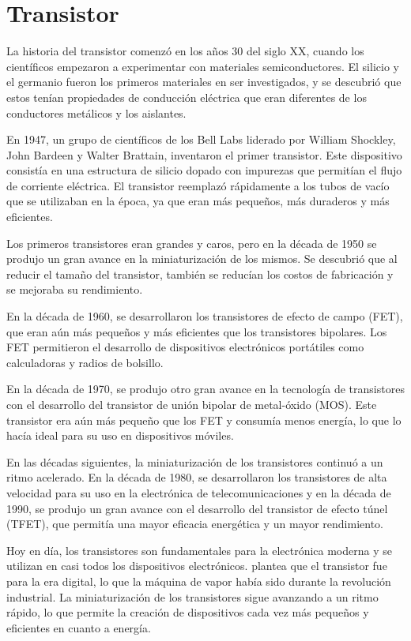 \documentclass{article}
\begin{document}
\newpage

\section*{Transistor}

La historia del transistor comenzó en los años 30 del siglo XX, cuando los científicos empezaron a experimentar
con materiales semiconductores. El silicio y el germanio fueron los primeros materiales en ser investigados, 
y se descubrió que estos tenían propiedades de conducción eléctrica que eran diferentes de los conductores metálicos
y los aislantes.

En 1947, un grupo de científicos de los Bell Labs liderado por William Shockley, John Bardeen y Walter Brattain, 
inventaron el primer transistor. Este dispositivo consistía en una estructura de silicio dopado con impurezas que 
permitían el flujo de corriente eléctrica. El transistor reemplazó rápidamente a los tubos de vacío 
que se utilizaban en la época, ya que eran más pequeños, más duraderos y más eficientes.

Los primeros transistores eran grandes y caros, pero en la década de 1950 se produjo un gran avance en la miniaturización
de los mismos. Se descubrió que al reducir el tamaño del transistor, también se reducían los costos de fabricación y se 
mejoraba su rendimiento.

En la década de 1960, se desarrollaron los transistores de efecto de campo (FET), que eran aún más 
pequeños y más eficientes que los transistores bipolares. Los FET permitieron el desarrollo de dispositivos 
electrónicos portátiles como calculadoras y radios de bolsillo. 

En la década de 1970, se produjo otro gran avance en la tecnología de transistores con el desarrollo del 
transistor de unión bipolar de metal-óxido (MOS). Este transistor era aún más pequeño que los FET y consumía 
menos energía, lo que lo hacía ideal para su uso en dispositivos móviles. 

En las décadas siguientes, la miniaturización de los transistores continuó a un ritmo acelerado. En la década de 1980, 
se desarrollaron los transistores de alta velocidad para su uso en la electrónica de telecomunicaciones y en la década
de 1990, se produjo un gran avance con el desarrollo del transistor de efecto túnel (TFET), que permitía una mayor 
eficacia energética y un mayor rendimiento.

Hoy en día, los transistores son fundamentales para la electrónica moderna y se utilizan en casi todos los 
dispositivos electrónicos. \cite{isaacson2019innovadores} plantea que el transistor fue para la era digital, 
lo que la máquina de vapor había sido durante la revolución industrial. La miniaturización de los transistores
sigue avanzando a un ritmo rápido, lo que permite la creación de dispositivos cada vez más pequeños 
y eficientes en cuanto a energía.
\end{document}
